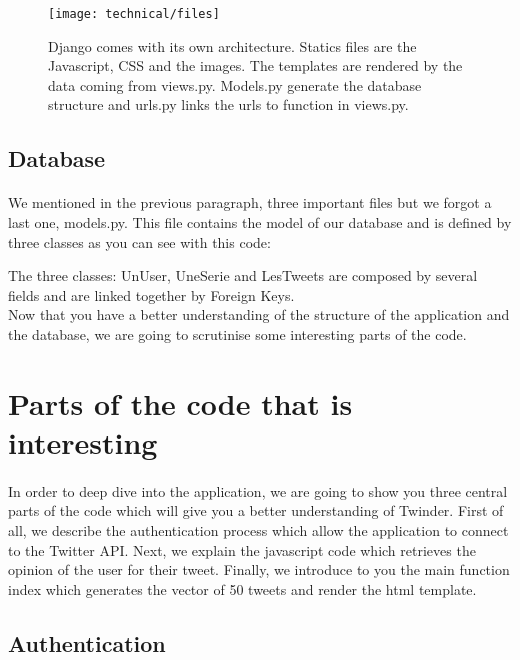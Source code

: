 \begin{figure}[h] 
\centering 
\texttt{[image: technical/files]} 
\caption[MVC model]{Django comes with its own architecture. Statics files are the Javascript, CSS and the images. The templates are rendered by the data coming from views.py. Models.py generate the database structure and urls.py links the urls to function in views.py.}
\label{fig:files} 
\end{figure}

\subsection{Database}

\paragraph{}
We mentioned in the previous paragraph, three important files but we forgot a last one, models.py.
This file contains the model of our database and is defined by three classes as you can see with this code:

 

The three classes: UnUser, UneSerie and LesTweets are composed by several fields and are linked together by Foreign Keys. \\
Now that you have a better understanding of the structure of the application and the database, we are going to scrutinise some interesting parts of the code.

\section{Parts of the code that is interesting}

\paragraph{}
In order to deep dive into the application, we are going to show you three central parts of the code which will give you a better understanding of Twinder. First of all, we describe the authentication process which allow the application to connect to the Twitter API. Next, we explain the javascript code which retrieves the opinion of the user for their tweet. Finally, we introduce to you the main function index which generates the vector of 50 tweets and render the html template.

\subsection{Authentication}

